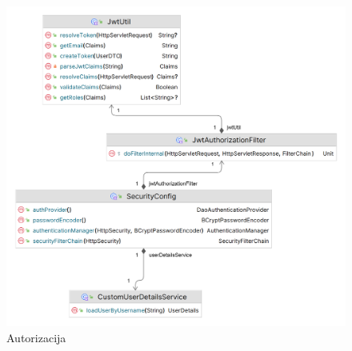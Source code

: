 			\begin{figure}[H]
				\includegraphics[scale=0.2]{slike/dijagram_security.PNG} 
				\centering
				\caption{Autorizacija}
				\label{dijagram_security}
			\end{figure}
			

			
			
			\eject
		

		
		\iffalse
